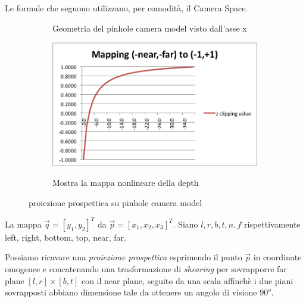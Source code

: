Le formule che seguono utilizzano, per comodit\`a, il Camera Space.\par
\begin{figure}[tb]
	\begin{subfigure}{0.5\linewidth}
		
		\label{chapter2:camera:pinhole:pinhole_projected}
		\caption{Geometria del pinhole camera model visto dall'asse x}
	\end{subfigure}
	\begin{subfigure}{0.5\linewidth}
		\includegraphics[width=\linewidth, trim=4px 4px 100px 40px, clip]{../assets/chapter2_camera_non_linear_mapping_learnwebgl.png}
		\label{chapter2:camera:pinhole:learnWebGLzremap}
		\caption{Mostra la mappa nonlineare della depth\footnotemark{}}
	\end{subfigure}
	\caption{proiezione prospettica su pinhole camera model}
	\label{chapter2:camera:pinhole}
\end{figure}
La mappa $\vec{q}=[y_1,y_2]^T$ da $\vec{p}=[x_1,x_2,x_3]^T$. Siano $l,r,b,t,n,f$ rispettivamente left, right, bottom, top, near, far.\par
Possiamo ricavare una \textit{proiezione prospettica}\footnotemark{} esprimendo il punto $\vec{p}$ in coordinate omogenee 
e concatenando una trasformazione di 
\textit{shearing}\footnotemark{} per sovrapporre far plane $[l,r]\times [b,t]$ con il near plane, seguito da una scala affinch\`e i due piani 
sovrapposti abbiano dimensione tale da ottenere un angolo di visione $90^o$.
